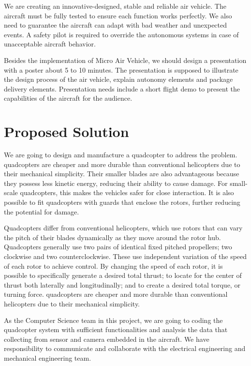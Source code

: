 \documentclass[letterpaper,10pt,draftclsnofoot,onecolumn]{IEEEtran}
\begin{document}
\begin{flushleft}
We are creating an innovative-designed, stable and reliable air vehicle. The aircraft must be fully tested to ensure each function works perfectly. We also need to guarantee the aircraft can adapt with bad weather and unexpected events. A safety pilot is required to override the autonomous systems in case of unacceptable aircraft behavior.\par

Besides the implementation of Micro Air Vehicle, we should design a presentation with a poster about 5 to 10 minutes. The presentation is supposed to illustrate the design process of the air vehicle, explain autonomy elements and package delivery elements. Presentation needs include a short flight demo to present the capabilities of the aircraft for the audience.

\section{Proposed Solution}
We are going to design and manufacture a quadcopter to address the problem. quadcopters are cheaper and more durable than conventional helicopters due to their mechanical simplicity. Their smaller blades are also advantageous because they possess less kinetic energy, reducing their ability to cause damage. For small-scale quadcopters, this makes the vehicles safer for close interaction. It is also possible to fit quadcopters with guards that enclose the rotors, further reducing the potential for damage.\par

Quadcopters differ from conventional helicopters, which use rotors that can vary the pitch of their blades dynamically as they move around the rotor hub. Quadcopters generally use two pairs of identical fixed pitched propellers; two clockwise and two counterclockwise. These use independent variation of the speed of each rotor to achieve control. By changing the speed of each rotor, it is possible to specifically generate a desired total thrust; to locate for the center of thrust both laterally and longitudinally; and to create a desired total torque, or turning force. quadcopters are cheaper and more durable than conventional helicopters due to their mechanical simplicity.\par

As the Computer Science team in this project, we are going to coding the quadcopter system with sufficient functionalities and analysis the data that collecting from sensor and camera embedded in the aircraft. We have responsibility to communicate and collaborate with the electrical engineering and mechanical engineering team.



\end{flushleft}
\end{document}
